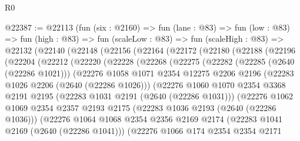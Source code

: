 \begin{lexlean}{R0}
\begin{coremodule}
@22387 := @22113
    (fun (six : @2160) =>
    fun (lane : @83) =>
    fun (low : @83) =>
    fun (high : @83) =>
    fun (scaleLow : @83) =>
    fun (scaleHigh : @83) =>
    @22132
      (@22140
        (@22148
          (@22156
            (@22164
              (@22172
                (@22180
                  (@22188
                    (@22196
                      (@22204
                        (@22212
                          (@22220
                            (@22228
                              (@22268
                                (@22275
                                  (@22282
                                    (@22285 (@2640 (@22286 @1021)))
                                    (@22276
                                      @1058
                                      @1071
                                      @2354
                                      @12275
                                      @2206
                                      @2196
                                      (@22283 @1026 @2206 (@2640 (@22286 @1026)))
                                      (@22276
                                        @1060
                                        @1070
                                        @2354
                                        @3368
                                        @2191
                                        @2195
                                        (@22283 @1031 @2191 (@2640 (@22286 @1031)))
                                        (@22276
                                          @1062
                                          @1069
                                          @2354
                                          @2357
                                          @2193
                                          @2175
                                          (@22283 @1036 @2193 (@2640 (@22286 @1036)))
                                          (@22276
                                            @1064
                                            @1068
                                            @2354
                                            @2356
                                            @2169
                                            @2174
                                            (@22283 @1041 @2169 (@2640 (@22286 @1041)))
                                            (@22276
                                              @1066
                                              @174
                                              @2354
                                              @2354
                                              @2171

\end{coremodule}
\end{lexlean}
